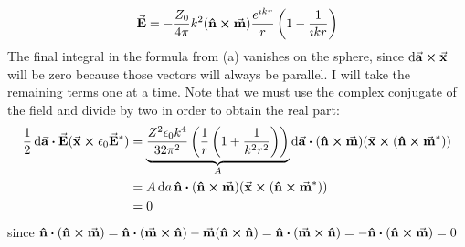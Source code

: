 \documentclass[a4paper,twoside]{article}
\begin{document}
\begin{itemize}
\begin{problem}
\begin{equation}
            \end{equation}
            \begin{equation}
                \va{E} = - \frac{Z_0}{4 \pi} k^2 ( \vu{n} \cross \va{m}) \frac{e^{\imath kr}}{r} \left( 1 - \frac{1}{\imath kr} \right)
            \end{equation}
            The final integral in the formula from (a) vanishes on the sphere, since $ \dd{ \va{a}} \cross \va{x} $ will be zero because those vectors will always be parallel. I will take the remaining terms one at a time. Note that we must use the complex conjugate of the field and divide by two in order to obtain the real part:
            \begin{align}
                \frac{1}{2} \dd{ \va{a}} \vdot \va{E} ( \va{x} \cross \epsilon_0 \va{E}^*) &= \underbrace{\frac{Z^2 \epsilon_0 k^4}{32 \pi^2} \left( \frac{1}{r} \left( 1 + \frac{1}{k^2 r^2} \right) \right)}_{A} \dd{ \va{a}} \vdot ( \vu{n} \cross \va{m}) ( \va{x} \cross ( \vu{n} \cross \va{m}^*)) \\
                &= A \dd{a} \vu{n} \vdot ( \vu{n} \cross \va{m})( \va{x} \cross ( \vu{n} \cross \va{m}^*)) \\
                &= 0
            \end{align}
            since $ \vu{n} \vdot ( \vu{n} \cross \va{m}) = \vu{n} \vdot ( \va{m} \cross \vu{n}) - \va{m} ( \vu{n} \cross \vu{n}) = \vu{n} \vdot (\va{m} \cross \vu{n}) = - \vu{n} \vdot ( \vu{n} \cross \va{m}) = 0 $


\end{problem}
\end{itemize}
\end{document}
